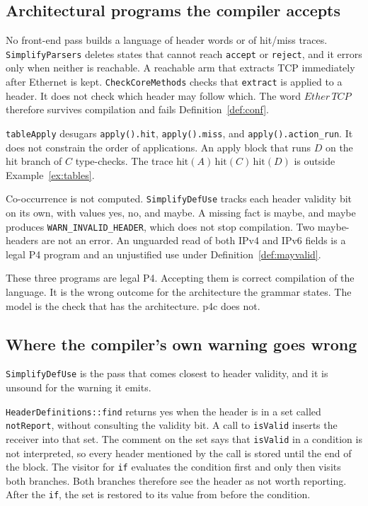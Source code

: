 \documentclass[a4paper,UKenglish,cleveref,autoref]{lipics-v2021}
\begin{document}
\subsection{Architectural programs the compiler accepts}

No front-end pass builds a language of header words or of hit/miss traces.
\texttt{SimplifyParsers} deletes states that cannot reach \texttt{accept} or \texttt{reject}, and it errors only when neither is reachable.
A reachable arm that extracts TCP immediately after Ethernet is kept.
\texttt{CheckCoreMethods} checks that \texttt{extract} is applied to a header.
It does not check which header may follow which.
The word \(\mathit{Ether}\,\mathit{TCP}\) therefore survives compilation and fails Definition~\ref{def:conf}.

\texttt{tableApply} desugars \texttt{apply().hit}, \texttt{apply().miss}, and \texttt{apply().action\_run}.
It does not constrain the order of applications.
An apply block that runs \(D\) on the hit branch of \(C\) type-checks.
The trace \(\mathrm{hit}(A)\,\mathrm{hit}(C)\,\mathrm{hit}(D)\) is outside Example~\ref{ex:tables}.

Co-occurrence is not computed.
\texttt{SimplifyDefUse} tracks each header validity bit on its own, with values yes, no, and maybe.
A missing fact is maybe, and maybe produces \texttt{WARN\_INVALID\_HEADER}, which does not stop compilation.
Two maybe-headers are not an error.
An unguarded read of both IPv4 and IPv6 fields is a legal P4 program and an unjustified use under Definition~\ref{def:mayvalid}.

These three programs are legal P4.
Accepting them is correct compilation of the language.
It is the wrong outcome for the architecture the grammar states.
The model is the check that has the architecture.
p4c does not.

\subsection{Where the compiler's own warning goes wrong}

\texttt{SimplifyDefUse} is the pass that comes closest to header validity, and it is unsound for the warning it emits.

\texttt{HeaderDefinitions::find} returns yes when the header is in a set called \texttt{notReport}, without consulting the validity bit.
A call to \texttt{isValid} inserts the receiver into that set.
The comment on the set says that \texttt{isValid} in a condition is not interpreted, so every header mentioned by the call is stored until the end of the block.
The visitor for \texttt{if} evaluates the condition first and only then visits both branches.
Both branches therefore see the header as not worth reporting.
After the \texttt{if}, the set is restored to its value from before the condition.
\end{document}
